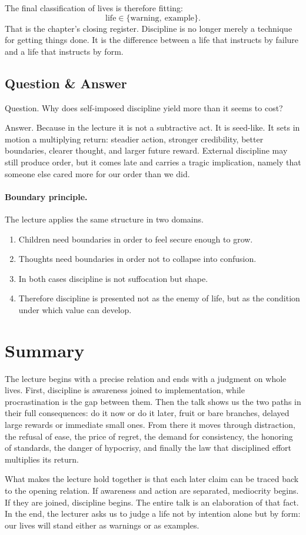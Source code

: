 The final classification of lives is therefore fitting:
\begin{equation}
\text{life} \in \{\text{warning},\ \text{example}\}.
\end{equation}
That is the chapter's closing register. Discipline is no longer merely a technique for getting things done. It is the difference between a life that instructs by failure and a life that instructs by form.

\subsection{Question \& Answer}

Question. Why does self-imposed discipline yield more than it seems to cost?

Answer. Because in the lecture it is not a subtractive act. It is seed-like. It sets in motion a multiplying return: steadier action, stronger credibility, better boundaries, clearer thought, and larger future reward. External discipline may still produce order, but it comes late and carries a tragic implication, namely that someone else cared more for our order than we did.

\paragraph{Boundary principle.}
The lecture applies the same structure in two domains.
\begin{enumerate}
\item Children need boundaries in order to feel secure enough to grow.
\item Thoughts need boundaries in order not to collapse into confusion.
\item In both cases discipline is not suffocation but shape.
\item Therefore discipline is presented not as the enemy of life, but as the condition under which value can develop.
\end{enumerate}

\section{Summary}

The lecture begins with a precise relation and ends with a judgment on whole lives. First, discipline is awareness joined to implementation, while procrastination is the gap between them. Then the talk shows us the two paths in their full consequences: do it now or do it later, fruit or bare branches, delayed large rewards or immediate small ones. From there it moves through distraction, the refusal of ease, the price of regret, the demand for consistency, the honoring of standards, the danger of hypocrisy, and finally the law that disciplined effort multiplies its return.

What makes the lecture hold together is that each later claim can be traced back to the opening relation. If awareness and action are separated, mediocrity begins. If they are joined, discipline begins. The entire talk is an elaboration of that fact. In the end, the lecturer asks us to judge a life not by intention alone but by form: our lives will stand either as warnings or as examples.